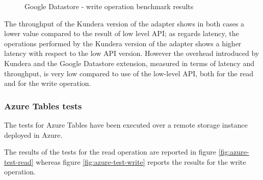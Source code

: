 \begin{figure}[tbh]
  \centering
  \caption{Google Datastore - write operation benchmark results}
  \label{fig:gae-test-write}
\end{figure} 
 
\noindent The throughput of the Kundera version of the adapter shows in both cases a lower value compared to the result of low level API; as regards latency, the operations performed by the Kundera version of the adapter shows a higher latency with respect to the low API version. However the overhead introduced by Kundera and the Google Datastore extension, measured in terms of latency and throughput, is very low compared to use of the low-level API, both for the read and for the write operation.

\subsubsection{Azure Tables tests}
The tests for Azure Tables have been executed over a remote storage instance deployed in Azure.

\noindent The results of the tests for the read operation are reported in figure \ref{fig:azure-test-read} whereas figure \ref{fig:azure-test-write} reports the results for the write operation.
 
